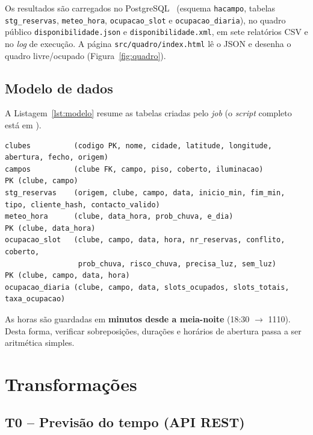 \documentclass[11pt,a4paper]{article}
\begin{document}
Os resultados são carregados no PostgreSQL~\cite{postgres} (esquema \texttt{hacampo}, tabelas \texttt{stg\_reservas}, \texttt{meteo\_hora}, \texttt{ocupacao\_slot} e \texttt{ocupacao\_diaria}), no quadro público \texttt{disponibilidade.json} e \texttt{disponibilidade.xml}, em sete relatórios CSV e no \textit{log} de execução. A página \texttt{src/quadro/index.html} lê o JSON e desenha o quadro livre/ocupado (Figura~\ref{fig:quadro}).

\subsection{Modelo de dados}

A Listagem~\ref{lst:modelo} resume as tabelas criadas pelo \textit{job} (o \textit{script} completo está em ).

\begin{lstlisting}[language={}, caption={Tabelas do esquema \texttt{hacampo}.}, label={lst:modelo}]
clubes          (codigo PK, nome, cidade, latitude, longitude, abertura, fecho, origem)
campos          (clube FK, campo, piso, coberto, iluminacao)               PK (clube, campo)
stg_reservas    (origem, clube, campo, data, inicio_min, fim_min, tipo, cliente_hash, contacto_valido)
meteo_hora      (clube, data_hora, prob_chuva, e_dia)                      PK (clube, data_hora)
ocupacao_slot   (clube, campo, data, hora, nr_reservas, conflito, coberto,
                 prob_chuva, risco_chuva, precisa_luz, sem_luz)            PK (clube, campo, data, hora)
ocupacao_diaria (clube, campo, data, slots_ocupados, slots_totais, taxa_ocupacao)
\end{lstlisting}

As horas são guardadas em \textbf{minutos desde a meia-noite} (18:30 $\rightarrow$ 1110). Desta forma, verificar sobreposições, durações e horários de abertura passa a ser aritmética simples.

\newpage
\section{Transformações}

\subsection{T0 -- Previsão do tempo (API REST)}
\end{document}
